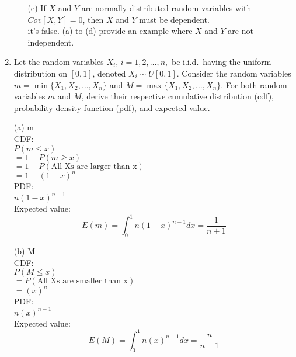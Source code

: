 \documentclass[letterpaper,12pt]{article}
\theoremstyle{definition}
\begin{document}
\begin{enumerate}
\begin{itemize}
			\item[(e)] If $X$ and $Y$ are normally distributed random variables with $Cov[X,Y]=0$, then $X$ and $Y$ 					must be dependent.\\
			it's false. (a) to (d) provide an example where $X$ and $Y$ are not independent.\\

		\end{itemize}

	\item Let the random variables $X_i$, $i=1,2,\ldots,n,$ be i.i.d.\ having the uniform distribution on $[0,1]$, denoted $X_i \sim U[0,1]$. Consider the random variables $m=\min\{X_1,X_2,\ldots,X_n\}$ and $M=\max\{X_1,X_2,\ldots,X_n\}$. For both random variables $m$ and $M$, derive their respective cumulative distribution (cdf), probability density function (pdf), and expected value.\\
			\item[(a)] m\\
			CDF:\\
			$P(m \leq x)$\\
			$= 1 - P(m \geq x)$\\
			$= 1 - P(\text{All Xs are larger than x})$\\
			$= 1 - (1 - x)^n$\\
			PDF:\\
			$n(1 - x)^{n - 1}$\\
			Expected value: \\
			$$E(m) = \int_{0}^{1} n(1 - x)^{n - 1} dx = \frac{1}{n + 1}$$
			\item[(b)] M\\
			CDF:\\
			$P(M \leq x)$\\
			$=  P(\text{All Xs are smaller than x})$\\
			$= (x)^n$\\
			PDF:\\
			$n(x)^{n - 1}$\\
			Expected value: \\
			$$E(M) = \int_{0}^{1} n(x)^{n - 1} dx = \frac{n}{n + 1}$$



\end{enumerate}
\end{document}
